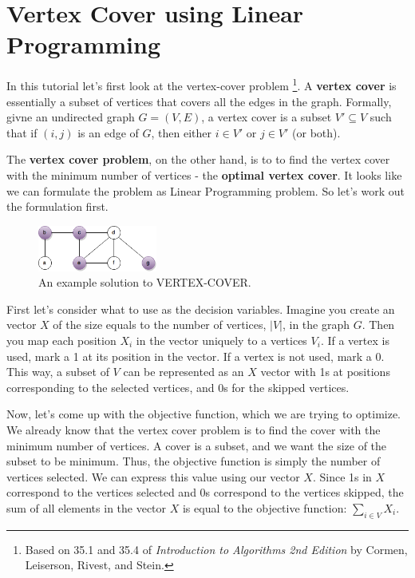 \documentclass{article}
\begin{document}
\section{Vertex Cover using Linear Programming}

In this tutorial let's first look at the vertex-cover problem 
\footnote{Based on 35.1 and 35.4 of {\it Introduction to Algorithms
2nd Edition} by Cormen, Leiserson, Rivest, and Stein.}. 
A {\bf vertex cover} is essentially a subset of vertices that covers all the 
edges in the graph.
Formally, givne an undirected graph $G = (V, E)$, a vertex cover is a subset
$V' \subseteq V$ such that if $(i, j)$ is an edge of $G$, then either
$i \in V'$ or $j \in V'$ (or both).

The {\bf vertex cover problem}, on the other hand, is to to find the vertex
cover with the minimum number of vertices - the {\bf optimal vertex cover}.
It looks like we can formulate the problem as Linear Programming problem.
So let's work out the formulation first.
\begin{figure}[H]
\centering
\includegraphics[width=0.35\textwidth]{vertexcover1.png}
\caption{An example solution to VERTEX-COVER.}
\end{figure}

First let's consider what to use as the decision variables.
Imagine you create an vector $X$ of the size equals to the number of vertices, 
$|V|$, in the graph $G$. 
Then you map each position $X_i$ in the vector uniquely to a vertices $V_i$.
If a vertex is used, mark a 1 at its position in the vector. If a vertex
is not used, mark a 0.
This way, a subset of $V$ can be represented as an $X$ vector with 1s at
positions corresponding to the selected vertices, and 0s for the skipped
vertices.

Now, let's come up with the objective function, which we are trying to optimize.
We already know that the vertex cover problem is to find the cover with
the minimum number of vertices. A cover is a subset, and we want the size
of the subset to be minimum. Thus, the objective function is simply the
number of vertices selected. We can express this value using our vector $X$.
Since 1s in $X$ correspond to the vertices selected and 0s correspond to the
vertices skipped, the sum of all elements in the vector $X$ is equal to the
objective function: $\sum_{i \in V} X_i$.
\end{document}
